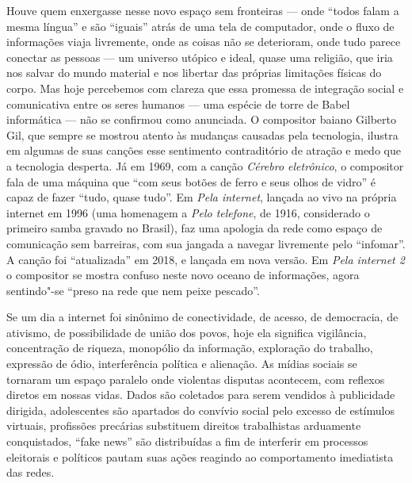 Houve quem enxergasse nesse novo espaço sem fronteiras --- onde ``todos
falam a mesma língua'' e são ``iguais'' atrás de uma tela de computador,
onde o fluxo de informações viaja livremente, onde as coisas não se
deterioram, onde tudo parece conectar as pessoas --- um universo utópico
e ideal, quase uma religião, que iria nos salvar do mundo material e nos
libertar das próprias limitações físicas do corpo. Mas hoje percebemos
com clareza que essa promessa de integração social e comunicativa entre
os seres humanos --- uma espécie de torre de Babel informática --- não se
confirmou como anunciada. O compositor baiano Gilberto Gil, que sempre
se mostrou atento às mudanças causadas pela tecnologia, ilustra em
algumas de suas canções esse sentimento contraditório de atração e medo
que a tecnologia desperta. Já em 1969, com a canção \emph{Cérebro
eletrônico}, o compositor fala de uma máquina que ``com seus botões de
ferro e seus olhos de vidro'' é capaz de fazer ``tudo, quase tudo''. Em
\emph{Pela internet}, lançada ao vivo na própria internet em 1996 (uma
homenagem a \emph{Pelo telefone}, de 1916, considerado o primeiro samba
gravado no Brasil), faz uma apologia da rede como espaço de comunicação
sem barreiras, com sua jangada a navegar livremente pelo ``infomar''. A
canção foi ``atualizada'' em 2018, e lançada em nova versão. Em
\emph{Pela internet 2} o compositor se mostra confuso neste novo oceano
de informações, agora sentindo"-se ``preso na rede que nem peixe
pescado''.

Se um dia a internet foi sinônimo de conectividade, de acesso, de
democracia, de ativismo, de possibilidade de união dos povos, hoje ela
significa vigilância, concentração de riqueza, monopólio da informação,
exploração do trabalho, expressão de ódio, interferência política e
alienação. As mídias sociais se tornaram um espaço paralelo onde
violentas disputas acontecem, com reflexos diretos em nossas vidas.
Dados são coletados para serem vendidos à publicidade dirigida,
adolescentes são apartados do convívio social pelo excesso de estímulos
virtuais, profissões precárias substituem direitos trabalhistas
arduamente conquistados, ``fake news'' são distribuídas a fim de
interferir em processos eleitorais e políticos pautam suas ações
reagindo ao comportamento imediatista das redes.

